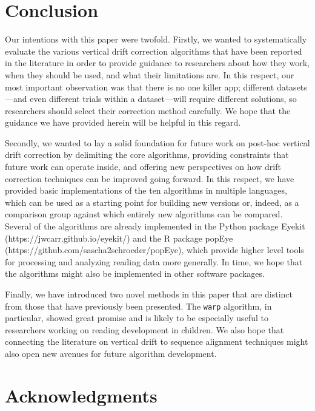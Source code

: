 \documentclass[doc,biblatex]{apa7}
\begin{document}
\section{Conclusion}

Our intentions with this paper were twofold. Firstly, we wanted to systematically evaluate the various vertical drift correction algorithms that have been reported in the literature in order to provide guidance to researchers about how they work, when they should be used, and what their limitations are. In this respect, our most important observation was that there is no one killer app; different datasets---and even different trials within a dataset---will require different solutions, so researchers should select their correction method carefully. We hope that the guidance we have provided herein will be helpful in this regard.

Secondly, we wanted to lay a solid foundation for future work on post-hoc vertical drift correction by delimiting the core algorithms, providing constraints that future work can operate inside, and offering new perspectives on how drift correction techniques can be improved going forward. In this respect, we have provided basic implementations of the ten algorithms in multiple languages, which can be used as a starting point for building new versions or, indeed, as a comparison group against which entirely new algorithms can be compared. Several of the algorithms are already implemented in the Python package Eyekit (https://jwcarr.github.io/eyekit/) and the R package popEye (https://github.com/sascha2schroeder/popEye), which provide higher level tools for processing and analyzing reading data more generally. In time, we hope that the algorithms might also be implemented in other software packages.

Finally, we have introduced two novel methods in this paper that are distinct from those that have previously been presented. The \texttt{warp} algorithm, in particular, showed great promise and is likely to be especially useful to researchers working on reading development in children. We also hope that connecting the literature on vertical drift to sequence alignment techniques might also open new avenues for future algorithm development.

\section{Acknowledgments}
\end{document}
